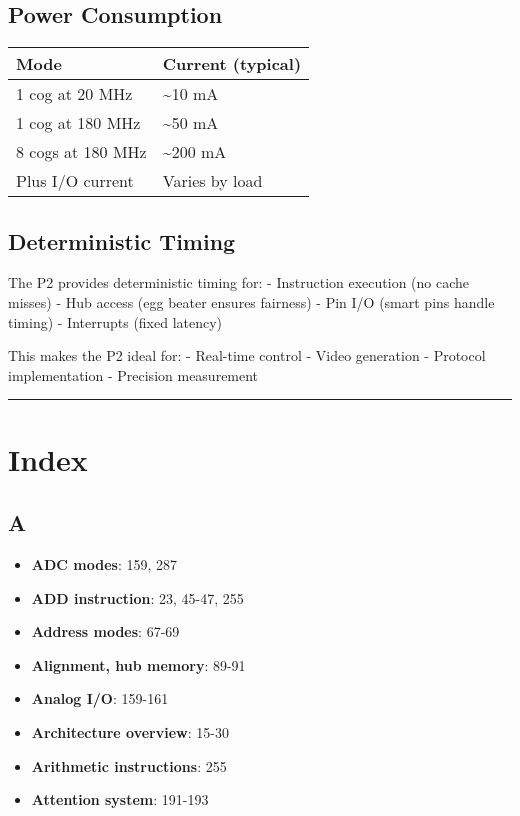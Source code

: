 \documentclass[11pt]{book}
\providecommand{\tightlist}{%
  \setlength{\itemsep}{0pt}\setlength{\parskip}{0pt}}
\begin{document}
\hypertarget{power-consumption}{%
\subsection{Power Consumption}\label{power-consumption}}

\begin{longtable}[]{@{}ll@{}}
\toprule
Mode & Current (typical) \\
\midrule
\endhead
1 cog at 20 MHz & \textasciitilde{}10 mA \\
1 cog at 180 MHz & \textasciitilde{}50 mA \\
8 cogs at 180 MHz & \textasciitilde{}200 mA \\
Plus I/O current & Varies by load \\
\bottomrule
\end{longtable}

\hypertarget{deterministic-timing}{%
\subsection{Deterministic Timing}\label{deterministic-timing}}

The P2 provides deterministic timing for: - Instruction execution (no
cache misses) - Hub access (egg beater ensures fairness) - Pin I/O
(smart pins handle timing) - Interrupts (fixed latency)

This makes the P2 ideal for: - Real-time control - Video generation -
Protocol implementation - Precision measurement

\begin{center}\rule{0.5\linewidth}{0.5pt}\end{center}

\hypertarget{index}{%
\section{Index}\label{index}}

\hypertarget{a}{%
\subsection{A}\label{a}}

\begin{itemize}
\tightlist
\item
  \textbf{ADC modes}: 159, 287
\item
  \textbf{ADD instruction}: 23, 45-47, 255
\item
  \textbf{Address modes}: 67-69
\item
  \textbf{Alignment, hub memory}: 89-91
\item
  \textbf{Analog I/O}: 159-161
\item
  \textbf{Architecture overview}: 15-30
\item
  \textbf{Arithmetic instructions}: 255
\item
  \textbf{Attention system}: 191-193
\end{itemize}
\end{document}
